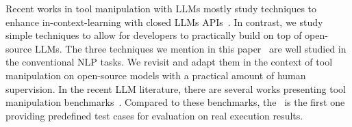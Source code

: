 Recent works in tool manipulation with LLMs mostly study techniques to enhance in-context-learning with closed LLMs APIs~\cite{schick2023toolformer, li2023api, qin2023tool, autogpt, shen2023hugginggpt}. In contrast, we study simple techniques to allow for developers to practically build on top of open-source LLMs.
The three techniques we mention in this paper~\cite{glaese2022improving, brown2020language, izacard2022few, ratner2017snorkel} are well studied in the conventional NLP tasks. We revisit and adapt them in the context of tool manipulation on open-source models with a practical amount of human supervision.
In the recent LLM literature, there are several works presenting tool manipulation benchmarks~\cite{li2023api, qin2023tool}. Compared to these benchmarks, the \snact~is the first one providing predefined test cases for evaluation on real execution results.




